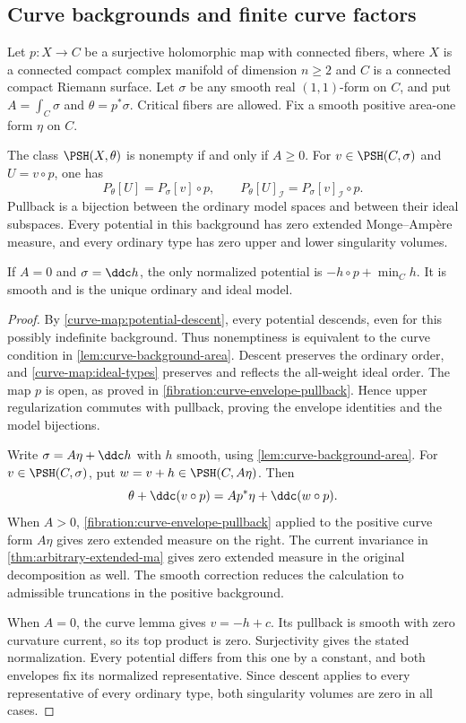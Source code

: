 \subsection{Curve backgrounds and finite curve factors}
\label{curve-backgrounds647:scope}

Let $p:X\to C$ be a surjective holomorphic map with connected
fibers, where $X$ is a connected compact complex manifold of
dimension $n\geq2$ and $C$ is a connected compact Riemann surface.
Let $\sigma$ be any smooth real $(1,1)$-form on $C$, and put
$A=\int_C\sigma$ and $\theta=p^*\sigma$. Critical fibers are
allowed. Fix a smooth positive area-one form $\eta$ on $C$.

\begin{proposition}\label{curve-backgrounds647:envelopes-and-mass}
The class $\PSH(X,\theta)$ is nonempty if and only if $A\geq0$.
For $v\in\PSH(C,\sigma)$ and $U=v\circ p$, one has
\[
 P_\theta[U]=P_\sigma[v]\circ p,\qquad
 P_\theta[U]_{\mathcal I}=P_\sigma[v]_{\mathcal I}\circ p.
\]
Pullback is a bijection between the ordinary model spaces and
between their ideal subspaces. Every potential in this background
has zero extended Monge--Amp\`ere measure, and every ordinary type
has zero upper and lower singularity volumes.

If $A=0$ and $\sigma=\ddc h$, the only normalized potential is
$-h\circ p+\min_Ch$. It is smooth and is the unique ordinary and
ideal model.
\end{proposition}
\begin{proof}
By \cref{curve-map:potential-descent}, every potential descends,
even for this possibly indefinite background. Thus nonemptiness
is equivalent to the curve condition in
\cref{lem:curve-background-area}. Descent preserves the ordinary
order, and \cref{curve-map:ideal-types} preserves and reflects
the all-weight ideal order. The map $p$ is open, as proved in
\cref{fibration:curve-envelope-pullback}. Hence upper
regularization commutes with pullback, proving the envelope
identities and the model bijections.

Write $\sigma=A\eta+\ddc h$ with $h$ smooth, using
\cref{lem:curve-background-area}. For $v\in\PSH(C,\sigma)$, put
$w=v+h\in\PSH(C,A\eta)$. Then
\[
 \theta+\ddc(v\circ p)
   =A p^*\eta+\ddc(w\circ p).
\]
When $A>0$, \cref{fibration:curve-envelope-pullback} applied to
the positive curve form $A\eta$ gives zero extended measure on
the right. The current invariance in
\cref{thm:arbitrary-extended-ma} gives zero extended measure in
the original decomposition as well. The smooth correction
reduces the calculation to admissible truncations in the
positive background.

When $A=0$, the curve lemma gives $v=-h+c$. Its pullback is
smooth with zero curvature current, so its top product is zero.
Surjectivity gives the stated normalization. Every potential
differs from this one by a constant, and both envelopes fix its
normalized representative. Since descent applies to every
representative of every ordinary type, both singularity volumes
are zero in all cases.
\end{proof}

